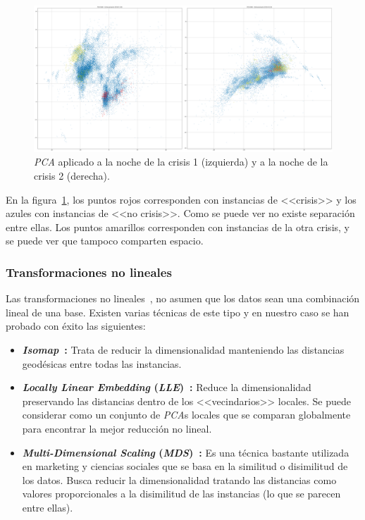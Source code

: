 \begin{figure}[H]
	\centering
	\includegraphics[width=1\textwidth]{../img/pca.png}
	\caption[Ejemplo de \textit{PCA}.] {\textit{PCA} aplicado a la noche de la crisis 1 (izquierda) y a la noche de la crisis 2 (derecha).}
	\label{fig:pca}
\end{figure}

En la figura~\ref{fig:pca}, los puntos rojos corresponden con instancias de <<crisis>> y los azules con instancias de <<no crisis>>. Como se puede ver no existe separación entre ellas. Los puntos amarillos corresponden con instancias de la otra crisis, y se puede ver que tampoco comparten espacio. 

\subsubsection{Transformaciones no lineales}

Las transformaciones no lineales~\cite{manifold}, no asumen que los datos sean una combinación lineal de una base. Existen varias técnicas de este tipo y en nuestro caso se han probado con éxito las siguientes: 

\begin{itemize}
	\item \textbf{\textit{Isomap}~\cite{isomap}:} Trata de reducir la dimensionalidad manteniendo las distancias geodésicas entre todas las instancias.
	\item \textbf{\textit{Locally Linear Embedding} (\textit{LLE})~\cite{lle}:} Reduce la dimensionalidad preservando las distancias dentro de los <<vecindarios>> locales. Se puede considerar como un conjunto de \textit{PCA}s locales que se comparan globalmente para encontrar la mejor reducción no lineal. 
	\item \textbf{\textit{Multi-Dimensional Scaling} (\textit{MDS})~\cite{mds}:} Es una técnica bastante utilizada en marketing y ciencias sociales que se basa en la similitud o disimilitud de los datos. Busca reducir la dimensionalidad tratando las distancias como valores proporcionales a la disimilitud de las instancias (lo que se parecen entre ellas).   
\end{itemize}

